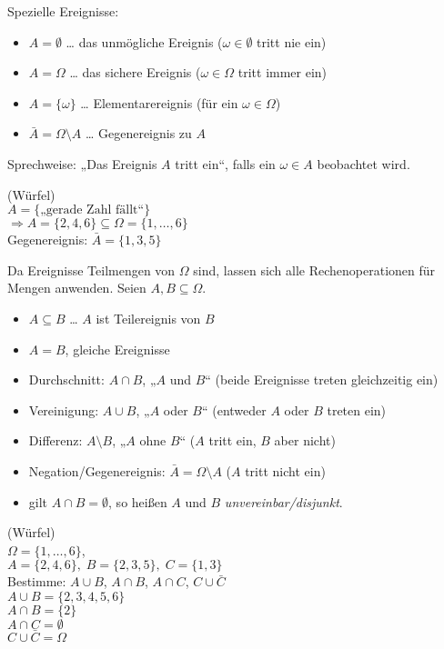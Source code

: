 \documentclass{scrreprt}
\begin{document}
Spezielle Ereignisse:
\begin{itemize}
\item $A = \emptyset$ \tab … das unmögliche Ereignis ($\omega\in \emptyset$ tritt nie ein)
\item $A=\Omega$ \tab … das sichere Ereignis ($\omega \in \Omega$ tritt immer ein)
\item $A=\{\omega\}$ \tab … Elementarereignis (für ein $\omega \in \Omega$)
\item $\bar A = \Omega \setminus A$ \tab … Gegenereignis zu $A$
\end{itemize}
Sprechweise: „Das Ereignis $A$ tritt ein“, falls ein $\omega \in A$ beobachtet wird.

 (Würfel)\\
$A=\{\text{„gerade Zahl fällt“}\}$\\
$\Rightarrow A=\{2,4,6\} \subseteq \Omega = \{1,\dots,6\}$\\
Gegenereignis: $\bar A = \{1,3,5\}$

 Da Ereignisse Teilmengen von $\Omega$ sind, lassen sich alle Rechenoperationen für Mengen anwenden. Seien $A,B \subseteq \Omega$.
\begin{itemize}
\item $A \subseteq B$ … $A$ ist Teilereignis von $B$
\item $A=B$, gleiche Ereignisse
\item Durchschnitt: $A \cap B$, „$A$ und $B$“ (beide Ereignisse treten gleichzeitig ein)
\item Vereinigung: $A \cup B$, „$A$ oder $B$“ (entweder $A$ oder $B$ treten ein)
\item Differenz: $A \setminus B$, „$A$ ohne $B$“ ($A$ tritt ein, $B$ aber nicht)
\item Negation/Gegenereignis: $\bar A = \Omega\setminus A$ ($A$ tritt nicht ein)
\item gilt $A \cap B = \emptyset$, so heißen $A$ und $B$ \emph{unvereinbar/disjunkt}.
\end{itemize}

 (Würfel)\\
$\Omega = \{1,\dots,6\}$,\\
$A=\{2,4,6\},\; B=\{2,3,5\},\; C =\{1,3\}$\\
Bestimme: $A \cup B$, $A \cap B$, $A \cap C$, $C \cup \bar C$\\
$A \cup B = \{2,3,4,5,6\}$\\
$A \cap B = \{2\}$\\
$A \cap C = \emptyset$\\
$C \cup \bar C = \Omega$
\end{document}
